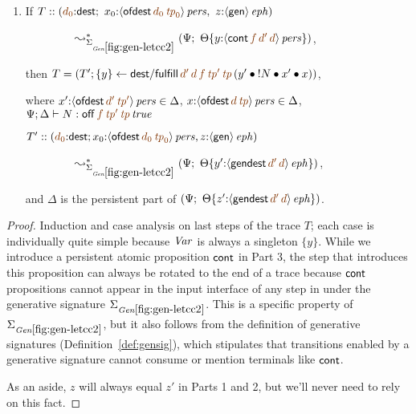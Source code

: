 \begin{lemma}
\begin{enumerate}
\medskip
\item If $T :: \left(\lf{d_0}{:}{\sf dest}; ~ x_0{:}\ispers{\susp{{\sf
          ofdest}\,\lf{d_0}\,\lf{{\it tp}_0}}},  ~ z{:}\iseph{\susp{{\sf
          gen}}}\right)$

   $~\qquad \qquad \leadsto^*_{\siggenletcc} \left(\Psi; ~
    \tackon{\Theta}{y{:}\ispers{\susp{{\sf
            cont}\,\lf{f}\,\lf{d'}\,\lf{d}}}}\right)$,
\smallskip

    then $T = (T'; \trstep{y}{{\sf dest/fulfill}\,\lf{d'}\,\lf{d}\,\lf{f}\,\lf{{\it tp}'}\,\lf{{\it tp}}\,
      (\tfuser{y'}{\tfuser{\tbangr{N}}{\tfuser{x'}{x}}})})$,

    where $x'{:}\ispers{\susp{{\sf ofdest}\,\lf{d'}\,\lf{{\it tp}'}}} 
           \in \Delta$,
    $x{:}\ispers{\susp{{\sf ofdest}\,\lf{d}\,\lf{{\it tp}}}} \in \Delta$,
    $\Psi; \Delta \vdash N : 
       \isconc{{\sf off}\,\lf{f}\,\lf{{\it tp}'}\,\lf{{\it tp}}}$

    $T' :: \left(\lf{d_0}{:}{\sf dest}; x_0{:}\ispers{\susp{{\sf
          ofdest}\,\lf{d_0}\,\lf{{\it tp}_0}}}, z{:}\iseph{\susp{{\sf
          gen}}}\right)$

   $~\qquad \qquad \leadsto^*_{\siggenletcc} \left(\Psi; ~
          \tackon{\Theta}
            {y'{:}\iseph{\susp{{\sf gendest}\,\lf{d'}\,\lf{d}}}}\right)$,

    and $\Delta$ is the persistent part of 
    $\left(\Psi; ~ \tackon{\Theta}
      {z'{:}\iseph{\susp{{\sf gendest}\,\lf{d'}\,\lf{d}}}}\right)$.
\smallskip
 
\end{enumerate}
\end{lemma}

\begin{proof}
  Induction and case analysis on last steps of the trace $T$; each
  case is individually quite simple because ${\it Var}$ is always a
  singleton $\{ y \}$.  While we introduce a persistent atomic
  proposition ${\sf cont}$ in Part 3, the step that introduces this
  proposition can always be rotated to the end of a trace because
  ${\sf cont}$ propositions cannot appear in the input interface of
  any step in under the generative signature $\siggenletcc$. This is a
  specific property of $\siggenletcc$, but it also follows from the
  definition of generative signatures (Definition~\ref{def:gensig}),
  which stipulates that transitions enabled by a generative signature
  cannot consume or mention terminals like ${\sf cont}$.

  As an aside, $z$ will always equal $z'$ in Parts 1 and 2, but we'll
  never need to rely on this fact.
\end{proof}


